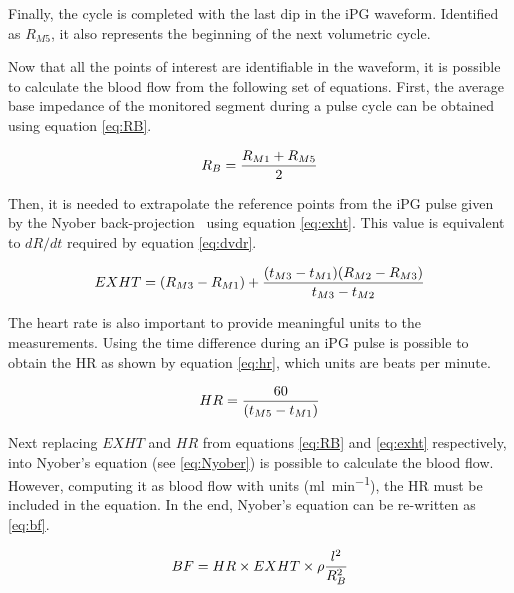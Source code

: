 
Finally, the cycle is completed with the last dip in the iPG waveform. Identified as $R_{M5}$, it also represents the beginning of the next volumetric cycle. 

Now that all the points of interest are identifiable in the waveform, it is possible to calculate the blood flow from the following set of equations. First, the average base impedance of the monitored segment during a pulse cycle can be obtained using equation \ref{eq:RB}.

\begin{align}
	\label{eq:RB}
	R_B = \frac{R_{M1}+R_{M5}}{2} \tagaddtext{[\si{\Omega}]}
\end{align}

Then, it is needed to extrapolate the reference points from the iPG pulse given by the Nyober back-projection~\cite{montgomery2011segmental} using equation \ref{eq:exht}. This value is equivalent to $dR/dt$ required by equation \ref{eq:dvdr}.

\begin{align}
	\label{eq:exht}
	EXHT = (R_{M3}-R_{M1}) + \frac{(t_{M3}-t_{M1})(R_{M2}-R_{M3})}{t_{M3}-t_{M2}} \tagaddtext{[\si{\Omega}]}
\end{align}

The heart rate is also important to provide meaningful units to the measurements. Using the time difference during an iPG pulse is possible to obtain the HR as shown by equation \ref{eq:hr}, which units are beats per minute.

\begin{align}
	\label{eq:hr}
	HR = \frac{60}{(t_{M5}-t_{M1})}  \tagaddtext{[\si{bpm}]}
\end{align}

Next replacing $EXHT$ and $HR$ from equations \ref{eq:RB} and \ref{eq:exht} respectively, into Nyober's equation (see \ref{eq:Nyober}) is possible to calculate the blood flow. However, computing it as blood flow with units (\si{\milli\litre\per\minute}), the HR must be included in the equation. In the end, Nyober's equation can be re-written as \ref{eq:bf}. 

\begin{align}
	\label{eq:bf}
	BF = HR \times EXHT \times \rho \frac{l^2}{R_B^2} \tagaddtext{[\si{\ml\per\min}]}
\end{align}


